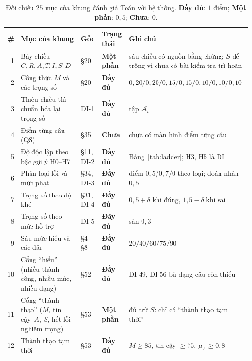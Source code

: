 \begin{table}[tp]
\centering\footnotesize
\caption{Đối chiếu $25$ mục của khung đánh giá Toán với hệ thống. \textcolor{zoneA}{\textbf{Đầy đủ}}: $1$ điểm; \textcolor{llm}{\textbf{Một phần}}: $0{,}5$; \textcolor{zoneE}{\textbf{Chưa}}: $0$.}\label{tab:fidelity}
\begin{tabular}{@{}r>{\raggedright\arraybackslash}p{5.6cm}>{\raggedright\arraybackslash}p{2.2cm}>{\raggedright\arraybackslash}p{1.7cm}>{\raggedright\arraybackslash}p{5.8cm}@{}}
\toprule
\# & Mục của khung & Gốc & Trạng thái & Ghi chú \\
\midrule
1 & Bảy chiều $C,R,A,T,I,S,D$ & §20 & \textcolor{llm}{\textbf{Một phần}} & sáu chiều có nguồn bằng chứng; $S$ để trống vì chưa có bài kiểm tra trì hoãn \\
2 & Công thức $M$ và các trọng số & §20 & \textcolor{zoneA}{\textbf{Đầy đủ}} & $0{,}20/0{,}20/0{,}15/0{,}15/0{,}10/0{,}10/0{,}10$ \\
3 & Thiếu chiều thì chuẩn hóa lại trọng số & DI-1 & \textcolor{zoneA}{\textbf{Đầy đủ}} & tập $\mathcal{A}_v$ \\
4 & Điểm từng câu (QS) & §35 & \textcolor{zoneE}{\textbf{Chưa}} & chưa có màn hình điểm từng câu \\
5 & Độ độc lập theo bậc gợi ý H0--H7 & §11, DI-2 & \textcolor{zoneA}{\textbf{Đầy đủ}} & Bảng~\ref{tab:ladder}; H3, H5 là DI \\
6 & Phân loại lỗi và mức phạt & §34, DI-3 & \textcolor{zoneA}{\textbf{Đầy đủ}} & điểm $0{,}5/0{,}7/0$ theo loại; đoán nhân $0{,}5$ \\
7 & Trọng số theo độ khó & §31, DI-4 & \textcolor{zoneA}{\textbf{Đầy đủ}} & $0{,}5+\delta$ khi đúng, $1{,}5-\delta$ khi sai \\
8 & Trọng số theo mức hỗ trợ & DI-5 & \textcolor{zoneA}{\textbf{Đầy đủ}} & sàn $0{,}3$ \\
9 & Sáu mức hiểu và các dải & §4--§8 & \textcolor{zoneA}{\textbf{Đầy đủ}} & $20/40/60/75/90$ \\
10 & Cổng ``hiểu'' (nhiều thành công, nhiều mức, nhiều dạng) & §52 & \textcolor{zoneA}{\textbf{Đầy đủ}} & DI-49, DI-56 bù dạng câu còn thiếu \\
11 & Cổng ``thành thạo'' ($M$, tin cậy, $A$, $S$, hết lỗi nghiêm trọng) & §53 & \textcolor{llm}{\textbf{Một phần}} & đủ trừ $S$: chỉ có ``thành thạo tạm thời'' \\
12 & Thành thạo tạm thời & §53 & \textcolor{zoneA}{\textbf{Đầy đủ}} & $M\ge85$, tin cậy $\ge75$, $\mu_A\ge0{,}8$ \\

\end{tabular}
\end{table}

